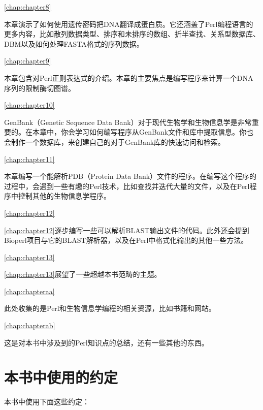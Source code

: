 \autoref{chap:chapter8}
\begin{adjustwidth}{4em}{0cm}
本章演示了如何使用遗传密码把DNA翻译成蛋白质。它还涵盖了Perl编程语言的更多内容，比如散列数据类型、排序和未排序的数组、折半查找、关系型数据库、DBM以及如何处理FASTA格式的序列数据。
\end{adjustwidth}

\autoref{chap:chapter9}
\begin{adjustwidth}{4em}{0cm}
本章包含对Perl正则表达式的介绍。本章的主要焦点是编写程序来计算一个DNA序列的限制酶切图谱。
\end{adjustwidth}

\autoref{chap:chapter10}
\begin{adjustwidth}{4em}{0cm}
GenBank（Genetic Sequence Data Bank）对于现代生物学和生物信息学是非常重要的。在本章中，你会学习如何编写程序从GenBank文件和库中提取信息。你也会制作一个数据库，来创建自己的对于GenBank库的快速访问和检索。
\end{adjustwidth}

\autoref{chap:chapter11}
\begin{adjustwidth}{4em}{0cm}
本章编写一个能解析PDB（Protein Data Bank）文件的程序。在编写这个程序的过程中，会遇到一些有趣的Perl技术，比如查找并迭代大量的文件，以及在Perl程序中控制其他的生物信息学程序。
\end{adjustwidth}

\autoref{chap:chapter12}
\begin{adjustwidth}{4em}{0cm}
\autoref{chap:chapter12}逐步编写一些可以解析BLAST输出文件的代码。此外还会提到Bioperl项目与它的BLAST解析器，以及在Perl中格式化输出的其他一些方法。
\end{adjustwidth}

\autoref{chap:chapter13}
\begin{adjustwidth}{4em}{0cm}
\autoref{chap:chapter13}展望了一些超越本书范畴的主题。
\end{adjustwidth}

\autoref{chap:chapteraa}
\begin{adjustwidth}{4em}{0cm}
此处收集的是Perl和生物信息学编程的相关资源，比如书籍和网站。
\end{adjustwidth}

\autoref{chap:chapterab}
\begin{adjustwidth}{4em}{0cm}
这是对本书中涉及到的Perl知识点的总结，还有一些其他的东西。
\end{adjustwidth}

\section*{本书中使用的约定}
本书中使用下面这些约定：

